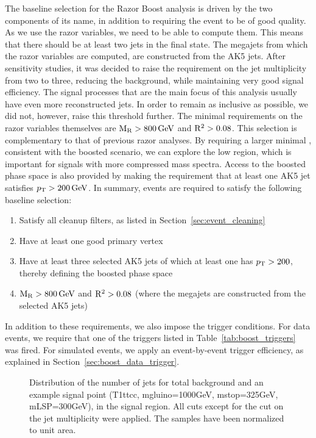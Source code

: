 
The baseline selection for the Razor Boost analysis is driven by the two components of its name, in
addition to requiring the event to be of good quality.
As we use the razor variables, we need to be able to compute them. This means that there should be
at least two jets in the final state. The megajets from which the razor variables are computed, are
constructed from the AK5 jets.  
After sensitivity studies, it was decided to raise the requirement on the jet multiplicity from two
to three, reducing the background, while maintaining very good signal efficiency. The signal
processes that are the main focus of this analysis usually have even more reconstructed jets. In
order to remain as inclusive as possible, we did not, however, raise this threshold further.
The minimal requirements on the razor variables themselves are $\mathrm{M_R} > 800\,\text{Ge\hspace{-.08em}V}$ and $\mathrm{R^2} > 0.08$.
This selection is complementary to that of previous razor analyses. By requiring a larger
minimal \mr, consistent with the boosted scenario, we can explore the low \rsq region, which is
important for signals with more compressed mass spectra.
Access to the boosted phase space is also provided by making the requirement that at least one AK5
jet satisfies $p_{\mathrm{T}} > 200\,\text{Ge\hspace{-.08em}V}$.
In summary, events are required to satisfy the following baseline selection:
\begin{enumerate}
 \item Satisfy all cleanup filters, as listed in Section~\ref{sec:event_cleaning}
 \item Have at least one good primary vertex
 \item Have at least three selected AK5 jets of which at least one has  $p_{\mathrm{T}} > 200$\GeV, thereby
 defining the boosted phase space
 \item $\mathrm{M_R} > 800\,\text{Ge\hspace{-.08em}V}$ and $\mathrm{R^2} > 0.08$ (where the megajets are constructed from the selected AK5
jets)
\end{enumerate}
In addition to these requirements, we also impose the trigger conditions. 
For data events, we require that one of the triggers listed in Table~\ref{tab:boost_triggers} was
fired. 
For simulated events, we apply an event-by-event trigger efficiency, as explained in
Section~\ref{sec:boost_data_trigger}. 


\begin{figure}[htbp]
 \centering
 \caption{Distribution of the number of jets for total background and an example signal point
(T1ttcc, mgluino=1000GeV, mstop=325GeV, mLSP=300GeV), in the signal region. All cuts except for the
cut on the jet multiplicity were applied. The samples have been normalized to unit area.
 \label{fig:njets_sig_BG}}
\end{figure}

